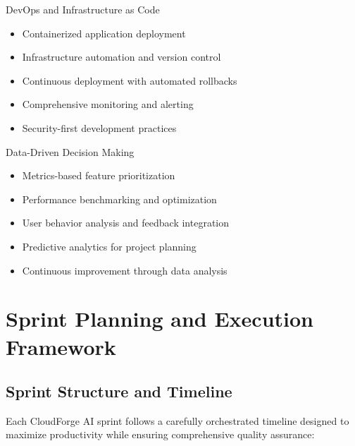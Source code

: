 \begin{sprintbox}{DevOps and Infrastructure as Code}
\begin{itemize}
    \item Containerized application deployment
    \item Infrastructure automation and version control
    \item Continuous deployment with automated rollbacks
    \item Comprehensive monitoring and alerting
    \item Security-first development practices
\end{itemize}
\end{sprintbox}

\begin{sprintbox}{Data-Driven Decision Making}
\begin{itemize}
    \item Metrics-based feature prioritization
    \item Performance benchmarking and optimization
    \item User behavior analysis and feedback integration
    \item Predictive analytics for project planning
    \item Continuous improvement through data analysis
\end{itemize}
\end{sprintbox}

\section{Sprint Planning and Execution Framework}

\subsection{Sprint Structure and Timeline}

Each CloudForge AI sprint follows a carefully orchestrated timeline designed to maximize productivity while ensuring comprehensive quality assurance:

